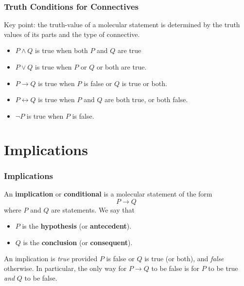 \documentclass[11pt, compress]{beamer}
\newcommand{\terminology}[1]{\textbf{#1}}\newcommand{\lt}{<}
\renewcommand{\iff}{\leftrightarrow}
\newcommand{\imp}{\rightarrow}
\begin{document}
\begin{frame}
\frametitle{Truth Conditions for Connectives}
 
Key point: the truth-value of a molecular statement is determined by the truth values of its parts and the type of connective.\pause 
\begin{itemize}[<+->]
\item{}\(P \wedge Q\) is true when both \(P\) and \(Q\) are true

\item{}\(P \vee Q\) is true when \(P\) or \(Q\) or both are true.

\item{}\(P \imp Q\) is true when \(P\) is false or \(Q\) is true or both.

\item{}\(P \iff Q\) is true when \(P\) and \(Q\) are both true, or both false.

\item{}\(\neg P\) is true when \(P\) is false.
\end{itemize}\end{frame}
 


\section{Implications}
\begin{frame}
\frametitle{Implications}
 
An \terminology{implication} or \terminology{conditional} is a molecular statement of the form%
\begin{equation*}
P \imp Q
\end{equation*}
where \(P\) and \(Q\) are statements. We say that\begin{itemize}
\item{}\(P\) is the \terminology{hypothesis} (or \terminology{antecedent}).

\item{}\(Q\) is the \terminology{conclusion} (or \terminology{consequent}).
\end{itemize} 
An implication is \emph{true} provided \(P\) is false or \(Q\) is true (or both), and \emph{false} otherwise. In particular, the only way for \(P \imp Q\) to be false is for \(P\) to be true \emph{and} \(Q\) to be false.\end{frame}
 
\end{document}

